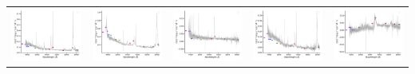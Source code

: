 \begin{center}
\begin{longtable}{l l l l l }
    \includegraphics[width=0.19\linewidth, clip]{Figs/Figs-sdss/spec-0981-52435-0575-STRIPE82-0102-040352.pdf} & \includegraphics[width=0.19\linewidth, clip]{Figs/Figs-sdss/spec-0982-52466-0091-STRIPE82-0103-087316.pdf} & \includegraphics[width=0.19\linewidth, clip]{Figs/Figs-sdss/spec-0982-52466-0477-STRIPE82-0103-089600.pdf} & \includegraphics[width=0.19\linewidth, clip]{Figs/Figs-sdss/spec-0983-52443-0348-STRIPE82-0104-019279.pdf} & \includegraphics[width=0.19\linewidth, clip]{Figs/Figs-sdss/spec-0983-52443-0459-STRIPE82-0106-052252.pdf} \\

\end{longtable}
\end{center}
